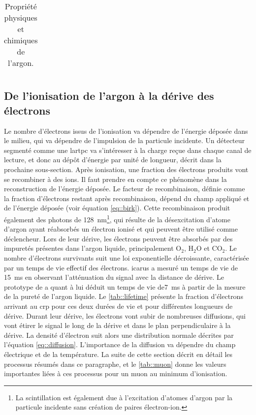 \begin{table}[htpb]
\begin{tabular}{|l|c|}
        \hline
      \end{tabular}
      \caption{\label{tab::Ar}Propriété physiques et chimiques de l'argon.}
    \end{table}

    \subsection{De l'ionisation de l'argon à la dérive des électrons}

        Le nombre d'électrons issus de l'ionisation va dépendre de l'énergie déposée dans le milieu, qui va dépendre de l'impulsion de la particule incidente. Un détecteur segmenté comme une \gls{lartpc} va s'intéresser à la charge reçue dans chaque canal de lecture, et donc au dépôt d'énergie par unité de longueur, décrit dans la prochaine sous-section. Après ionisation, une fraction des électrons produits vont se recombiner à des ions. Il faut prendre en compte ce phénomène dans la reconstruction de l'énergie déposée. Le facteur de recombinaison, définie comme la fraction d'électrons restant après recombinaison, dépend du champ appliqué et de l'énergie déposée (voir équation \eqref{eq::birk}). Cette recombinaison produit également des photons de \SI{128}{\nano\meter}\footnote{La scintillation est également due à l'excitation d'atomes d'argon par la particule incidente sans création de paires électron-ion.}, qui résulte de la désexcitation d'atome d'argon ayant réabsorbés un électron ionisé et qui peuvent être utilisé comme déclencheur. Lors de leur dérive, les électrons peuvent être absorbés par des impuretés présentes dans l'argon liquide, principalement O$_2$, H$_2$O et CO$_2$. Le nombre d'électrons survivants suit une loi exponentielle décroissante, caractérisée par un temps de vie effectif des électrons. \gls{icarus} a mesuré un temps de vie de \SI{15}{\milli\second}\cite{Antonello2014} en observant l'atténuation du signal avec la distance de dérive. Le prototype de \protosp{} a quant à lui déduit un temps de vie de\SI{7}{\milli\second} à partir de la mesure de la pureté de l'argon liquide. Le \autoref{tab::lifetime} présente la fraction d'électrons arrivant au \gls{crp} pour ces deux durées de vie et pour différentes longueurs de dérive. Durant leur dérive, les électrons vont subir de nombreuses diffusions, qui vont étirer le signal le long de la dérive et dans le plan perpendiculaire à la dérive. La densité d'électron suit alors une distribution normale décrites par l'équation \eqref{eq::diffusion}. L'importance de la diffusion va dépendre du champ électrique et de la température. La suite de cette section décrit en détail les processus résumés dans ce paragraphe, et le \autoref{tab::muon} donne les valeurs importantes liées à ces processus pour un muon au minimum d'ionisation. 

